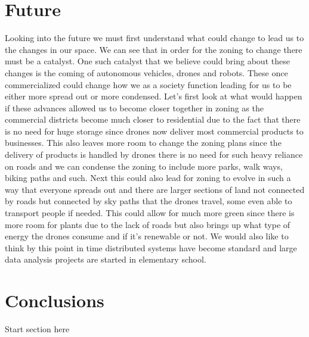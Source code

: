 \documentclass[titlepage]{article}
\begin{document}
\section{Future}
Looking into the future we must first understand what could change to lead us to the changes in our space. We can see that in order for the zoning to change there must be a catalyst. One such catalyst that we believe could bring about these changes is the coming of autonomous vehicles, drones and robots. These once commercialized could change how we as a society function leading for us to be either more spread out or more condensed. Let's first look at what would happen if these advances allowed us to become closer together in zoning as the commercial districts become much closer to residential due to the fact that there is no need for huge storage since drones now deliver most commercial products to businesses. This also leaves more room to change the zoning plans since the delivery of products is handled by drones there is no need for such heavy reliance on roads and we can condense the zoning to include more parks, walk ways, biking paths and such. Next this could also lead for zoning to evolve in such a way that everyone spreads out and there are larger sections of land not connected by roads but connected by sky paths that the drones travel, some even able to transport people if needed. This could allow for much more green since there is more room for plants due to the lack of roads but also brings up what type of energy the drones consume and if it's renewable or not. We would also like to think by this point in time distributed systems have become standard and large data analysis projects are started in elementary school.

\section{Conclusions}
Start section here



\end{document}
